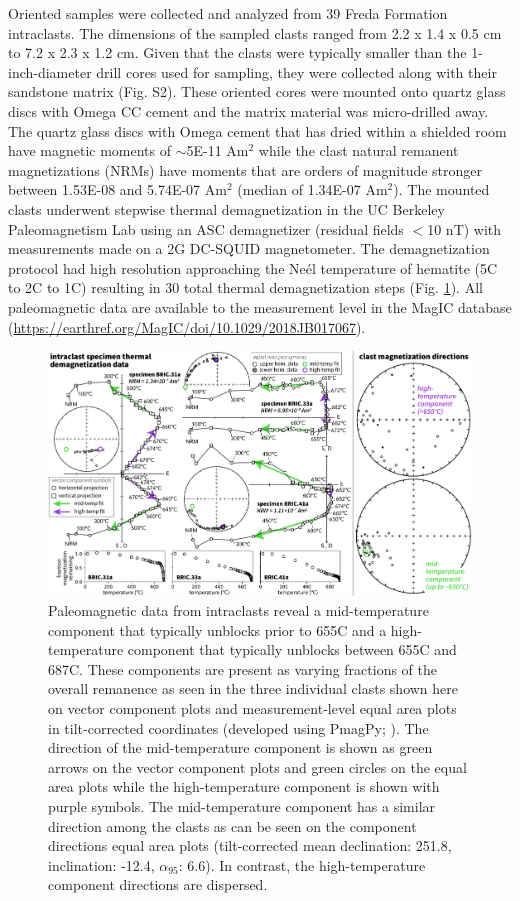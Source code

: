 \documentclass[draft]{agujournal2019}
\begin{document}
Oriented samples were collected and analyzed from 39 Freda Formation intraclasts. The dimensions of the sampled clasts ranged from 2.2 x 1.4 x 0.5 cm to 7.2 x 2.3 x 1.2 cm. Given that the clasts were typically smaller than the 1-inch-diameter drill cores used for sampling, they were collected along with their sandstone matrix (Fig. S2). These oriented cores were mounted onto quartz glass discs with Omega CC cement and the matrix material was micro-drilled away. The quartz glass discs with Omega cement that has dried within a shielded room have magnetic moments of $\sim$5E-11 Am$^2$ while the clast natural remanent magnetizations (NRMs) have moments that are orders of magnitude stronger between 1.53E-08 and 5.74E-07 Am$^2$ (median of 1.34E-07 Am$^2$). The mounted clasts underwent stepwise thermal demagnetization in the UC Berkeley Paleomagnetism Lab using an ASC demagnetizer (residual fields $<$10 nT) with measurements made on a 2G DC-SQUID magnetometer. The demagnetization protocol had high resolution  approaching the Ne\'el temperature of hematite (5\textdegree C to 2\textdegree C to 1\textdegree C) resulting in 30 total thermal demagnetization steps (Fig. \ref{fig:intraclast_pmag}). All paleomagnetic data are available to the measurement level in the MagIC database (\url{https://earthref.org/MagIC/doi/10.1029/2018JB017067}).

\begin{figure}[!ht]
\noindent\includegraphics[width=\textwidth]{Fig2_BRIC_pmag.pdf}
\caption{\small{Paleomagnetic data from intraclasts reveal a mid-temperature component that typically unblocks prior to 655\textdegree C and a high-temperature component that typically unblocks between 655\textdegree C and 687\textdegree C. These components are present as varying fractions of the overall remanence as seen in the three individual clasts shown here on vector component plots and measurement-level equal area plots in tilt-corrected coordinates (developed using PmagPy; \cite{Tauxe2016a}). The direction of the mid-temperature component is shown as green arrows on the vector component plots and green circles on the equal area plots while the high-temperature component is shown with purple symbols. The mid-temperature component has a similar direction among the clasts as can be seen on the component directions equal area plots (tilt-corrected mean declination: 251.8, inclination: -12.4, $\alpha_{95}$: 6.6). In contrast, the high-temperature component directions are dispersed.}}
\label{fig:intraclast_pmag}
\end{figure}
\end{document}
